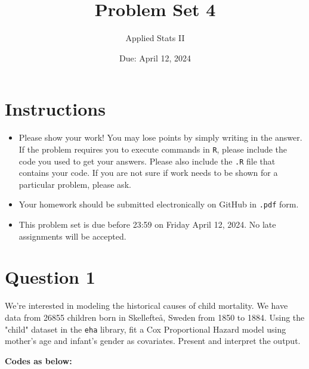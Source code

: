 \documentclass[12pt,letterpaper]{article}
\title{Problem Set 4}
\date{Due: April 12, 2024}
\author{Applied Stats II}
\begin{document}
	\maketitle
	\section*{Instructions}
	\begin{itemize}
	\item Please show your work! You may lose points by simply writing in the answer. If the problem requires you to execute commands in \texttt{R}, please include the code you used to get your answers. Please also include the \texttt{.R} file that contains your code. If you are not sure if work needs to be shown for a particular problem, please ask.
	\item Your homework should be submitted electronically on GitHub in \texttt{.pdf} form.
	\item This problem set is due before 23:59 on Friday April 12, 2024. No late assignments will be accepted.

	\end{itemize}

	\vspace{.25cm}
\section*{Question 1}
\vspace{.25cm}
\noindent We're interested in modeling the historical causes of child mortality. We have data from 26855 children born in Skellefteå, Sweden from 1850 to 1884. Using the "child" dataset in the \texttt{eha} library, fit a Cox Proportional Hazard model using mother's age and infant's gender as covariates. Present and interpret the output.

	\noindent \textbf{Codes as below:}
    \vspace{2.75cm}
    
\end{document}
